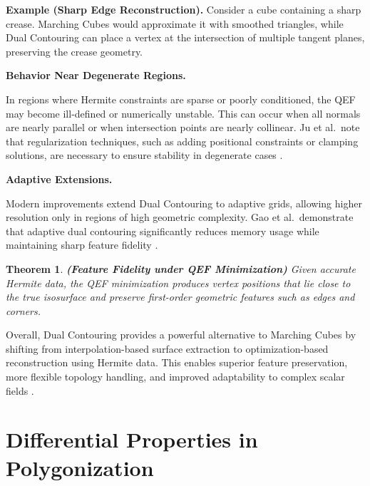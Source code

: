 \documentclass[12pt, a4paper, oneside]{book}
\theoremstyle{plain}
\newtheorem{theorem}{Theorem}[chapter]
\theoremstyle{definition}
\theoremstyle{remark}
\theoremstyle{definition}
\begin{document}
\textbf{Example (Sharp Edge Reconstruction).}
Consider a cube containing a sharp crease. Marching Cubes would approximate it with
smoothed triangles, while Dual Contouring can place a vertex at the intersection of
multiple tangent planes, preserving the crease geometry.

\vspace{0.5em}

\textbf{Behavior Near Degenerate Regions.}

In regions where Hermite constraints are sparse or poorly conditioned, the QEF may become
ill-defined or numerically unstable. This can occur when all normals are nearly parallel
or when intersection points are nearly collinear. Ju et al.\ note that regularization
techniques, such as adding positional constraints or clamping solutions, are necessary to
ensure stability in degenerate cases \cite{ju2002dual}.

\vspace{0.5em}

\textbf{Adaptive Extensions.}

Modern improvements extend Dual Contouring to adaptive grids, allowing higher resolution
only in regions of high geometric complexity. Gao et al.\ demonstrate that adaptive dual
contouring significantly reduces memory usage while maintaining sharp feature fidelity
\cite{gao2010adaptive}.

\vspace{0.5em}

\begin{theorem}
    \textbf{(Feature Fidelity under QEF Minimization)}
Given accurate Hermite data, the QEF minimization produces vertex positions that lie
close to the true isosurface and preserve first-order geometric features such as edges
and corners.
\end{theorem}

\vspace{0.5em}

Overall, Dual Contouring provides a powerful alternative to Marching Cubes by shifting
from interpolation-based surface extraction to optimization-based reconstruction using
Hermite data. This enables superior feature preservation, more flexible topology
handling, and improved adaptability to complex scalar fields
\cite{ju2002dual,kobbelt2001feature,schaefer2005qef,gao2010adaptive}.


\section{Differential Properties in Polygonization}
\end{document}
